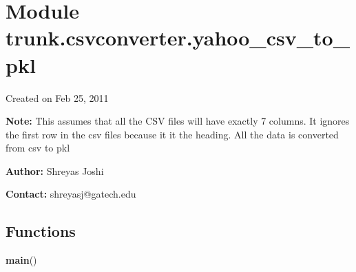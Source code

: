 %
%
%


\section{Module trunk.csvconverter.yahoo\_csv\_to\_pkl}

    \label{trunk:csvconverter:yahoo_csv_to_pkl}
Created on Feb 25, 2011

\textbf{Note:} This assumes that all the CSV files will have exactly 7 columns. It ignores
the first row in the csv files because it it the heading. All the data is 
converted from csv to pkl



\textbf{Author:} Shreyas Joshi



\textbf{Contact:} shreyasj@gatech.edu





  \subsection{Functions}

    \label{trunk:csvconverter:yahoo_csv_to_pkl:main}

    \vspace{0.5ex}

\hspace{.8\funcindent}\begin{boxedminipage}{\funcwidth}

    \raggedright \textbf{main}()

\setlength{\parskip}{2ex}
\setlength{\parskip}{1ex}
    \end{boxedminipage}


